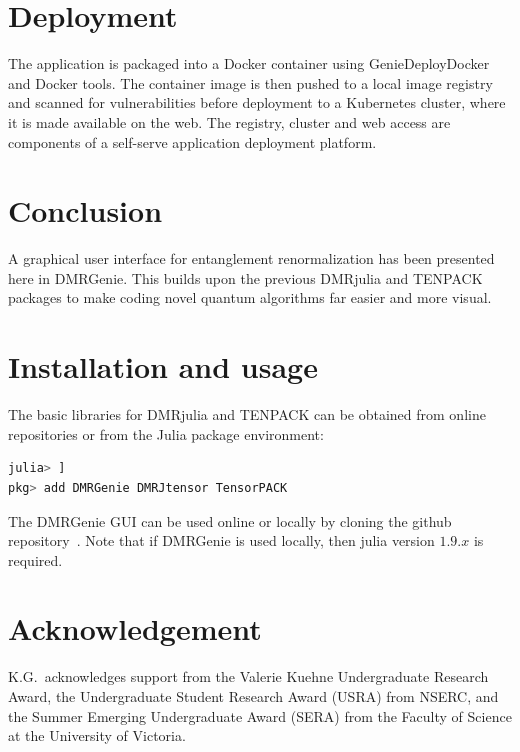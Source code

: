 \documentclass{juliacon}
\begin{document}
\section{Deployment}

The application is packaged into a Docker container using GenieDeployDocker and Docker tools.  The container image is then pushed to a local image registry and scanned for vulnerabilities before deployment to a Kubernetes cluster, where it is made available on the web.  The registry,  cluster and web access are components of a self-serve application deployment platform.

\section{Conclusion}

A graphical user interface for entanglement renormalization has been presented here in DMRGenie. This builds upon the previous DMRjulia and TENPACK packages to make coding novel quantum algorithms far easier and more visual. 

\section{Installation and usage}

The basic libraries for DMRjulia and TENPACK can be obtained from online repositories \cite{dmrjulia,tenpack} or from the Julia package environment:
\begin{lstlisting}[language = Julia]
julia> ]
pkg> add DMRGenie DMRJtensor TensorPACK
\end{lstlisting}

The DMRGenie GUI can be used online or locally by cloning the github repository~\cite{dmrgenie}. Note that if DMRGenie is used locally, then julia version $1.9.x$ is required.

\section{Acknowledgement}

K.G.~acknowledges support from the Valerie Kuehne Undergraduate Research Award, the Undergraduate Student Research Award (USRA) from NSERC, and the Summer Emerging Undergraduate Award (SERA) from the Faculty of Science at the University of Victoria. 
\end{document}
